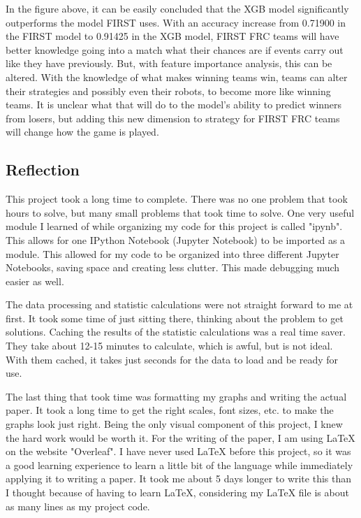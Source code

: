 \documentclass{article}
\begin{document}
\par
In the figure above, it can be easily concluded that the XGB model significantly outperforms the model FIRST uses. With an accuracy increase from 0.71900 in the FIRST model to 0.91425 in the XGB model, FIRST FRC teams will have better knowledge going into a match what their chances are if events carry out like they have previously. But, with feature importance analysis, this can be altered. With the knowledge of what makes winning teams win, teams can alter their strategies and possibly even their robots, to become more like winning teams. It is unclear what that will do to the model's ability to predict winners from losers, but adding this new dimension to strategy for FIRST FRC teams will change how the game is played.

\subsection{Reflection}
\par
This project took a long time to complete. There was no one problem that took hours to solve, but many small problems that took time to solve. One very useful module I learned of while organizing my code for this project is called "ipynb". This allows for one IPython Notebook (Jupyter Notebook) to be imported as a module. This allowed for my code to be organized into three different Jupyter Notebooks, saving space and creating less clutter. This made debugging much easier as well.

\par
The data processing and statistic calculations were not straight forward to me at first. It took some time of just sitting there, thinking about the problem to get solutions. Caching the results of the statistic calculations was a real time saver. They take about 12-15 minutes to calculate, which is awful, but is not ideal. With them cached, it takes just seconds for the data to load and be ready for use.

\par
The last thing that took time was formatting my graphs and writing the actual paper. It took a long time to get the right scales, font sizes, etc. to make the graphs look just right. Being the only visual component of this project, I knew the hard work would be worth it. For the writing of the paper, I am using \LaTeX{} on the website "Overleaf". I have never used \LaTeX{} before this project, so it was a good learning experience to learn a little bit of the language while immediately applying it to writing a paper. It took me about 5 days longer to write this than I thought because of having to learn \LaTeX, considering my \LaTeX{} file is about as many lines as my project code.
\end{document}
